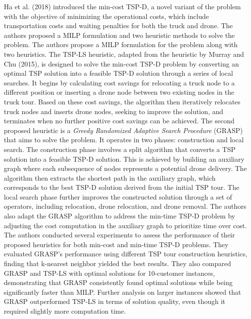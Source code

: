 \documentclass{article}
\begin{document}
	Ha et al. (2018) introduced the min-cost TSP-D, a novel variant of the problem with the objective of minimizing the operational costs, which include transportation costs and waiting penalties for both the truck and drone. The authors proposed a MILP formulation and two heuristic methods to solve the problem. The authors propose a MILP formulation for the problem along with two heuristics. The TSP-LS heuristic, adapted from the heuristic by Murray and Chu (2015), is designed to solve the min-cost TSP-D problem by converting an optimal TSP solution into a feasible TSP-D solution through a series of local searches. It begins by calculating cost savings for relocating a truck node to a different position or inserting a drone node between two existing nodes in the truck tour. Based on these cost savings, the algorithm then iteratively relocates truck nodes and inserts drone nodes, seeking to improve the solution, and terminates when no further positive cost savings can be achieved. The second proposed heuristic is a \textit{Greedy Randomized Adaptive Search Procedure} (GRASP) that aims to solve the problem. It operates in two phases: construction and local search. The construction phase involves a split algorithm that converts a TSP solution into a feasible TSP-D solution. This is achieved by building an auxiliary graph where each subsequence of nodes represents a potential drone delivery. The algorithm then extracts the shortest path in the auxiliary graph, which corresponds to the best TSP-D solution derived from the initial TSP tour. The local search phase further improves the constructed solution through a set of operators, including relocation, drone relocation, and drone removal. The authors also adapt the GRASP algorithm to address the min-time TSP-D problem by adjusting the cost computation in the auxiliary graph to prioritize time over cost. The authors conducted several experiments to assess the performance of their proposed heuristics for both min-cost and min-time TSP-D problems. They evaluated GRASP's performance using different TSP tour construction heuristics, finding that k-nearest neighbor yielded the best results. They also compared GRASP and TSP-LS with optimal solutions for 10-customer instances, demonstrating that GRASP consistently found optimal solutions while being significantly faster than MILP. Further analysis on larger instances showed that GRASP outperformed TSP-LS in terms of solution quality, even though it required slightly more computation time.
\end{document}

